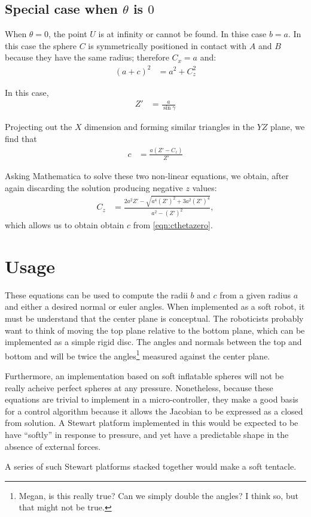 \documentclass{article}
\begin{document}
\subsection{Special case when $\theta$ is $0$ }

When $\theta = 0$, the point $U$ is at infinity or
cannot be found. In thise case $b = a$.
In this case the sphere $C$ is symmetrically
positioned in contact with $A$ and $B$ because
they have the same radius; therefore $C_x = a$ and:
\begin{align}
(a + c)^2 &= a^2 + C_z^2
\end{align}

In this case,
\begin{align}
Z' &= \frac{a}{\sin{\gamma}}
\end{align}

Projecting out the $X$ dimension and forming
similar triangles in the $YZ$ plane, we find that
\begin{align}
  c &= \frac{a( Z' -C_z )}{Z'} \label{eqn:cthetazero}
\end{align}

Asking Mathematica to solve these two non-linear equations, we obtain,
after again discarding the solution producing negative $z$ values:
\begin{align}
 C_z &=  \frac{2 a^2 Z' - \sqrt{a^4 (Z')^2 + 3 a^2 (Z')^4}}{a^2 - (Z')^2},
\end{align}
which allows us to obtain obtain $c$ from \ref{eqn:cthetazero}.


\section{Usage}

These equations can be used to compute the radii $b$ and $c$
from a given radius $a$ and either a desired normal or euler
angles. When implemented as a soft robot, it must be understand
that the center plane is conceptual. The roboticists probably
want to think of moving the top plane relative to the bottom plane,
which can be implemented as a simple rigid disc.
The angles and normals between the top and bottom and will be
twice the angles\footnote{Megan, is this really true? Can we simply double the angles? I think so, but that might not be true.} measured against the center plane.

Furthermore, an implementation based on soft inflatable spheres
will not be really acheive perfect spheres at any pressure.
Nonetheless, because these equations are trivial to implement
in a micro-controller, they make a good basis for a control
algorithm because it allows the Jacobian to be expressed as a
closed from solution. A Stewart platform implemented in this would
be expected to be have ``softly'' in response to pressure,
and yet have a predictable shape in the absence of external
forces.

A series of such Stewart platforms stacked together would make
a soft tentacle.

\printbibliography
\end{document}
